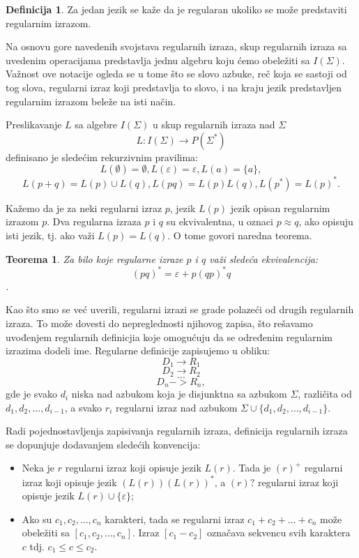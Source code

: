 \documentclass[12pt,oneside]{memoir}
\theoremstyle{plain}
\newtheorem{thm}{Teorema}[chapter] %
\theoremstyle{definition}
\newtheorem{defn}{Definicija} %
\begin{document}
\begin{defn}
Za jedan jezik se kaže da je regularan ukoliko se može predstaviti regularnim izrazom. 
\end{defn}

Na osnovu gore navedenih svojstava regularnih izraza, skup regularnih izraza sa uvedenim operacijama predstavlja jednu algebru koju ćemo obeležiti sa $I(\Sigma)$. Važnost ove notacije ogleda se u tome što se slovo azbuke, reč koja se sastoji od tog slova, regularni izraz koji predstavlja to slovo, i na kraju jezik predstavljen regularnim izrazom beleže na isti način. 

Preslikavanje $L$ sa algebre $I(\Sigma)$ u skup regularnih izraza nad $\Sigma$ $$ L : I(\Sigma) \rightarrow P(\Sigma^*)$$ definisano je sledećim rekurzivnim pravilima:
$$ L(\emptyset) = \emptyset, L(\varepsilon) = \varepsilon, L(a) = \{a\},$$
$$ L(p+q) = L(p) \cup L(q), L(pq) = L(p)L(q), L(p^*) = L(p)^*.$$

Kažemo da je za neki regularni izraz $p$, jezik $L(p)$ jezik opisan regularnim izrazom $p$. Dva regularna izraza $p$ i $q$ su ekvivalentna, u oznaci $p \approx q$, ako opisuju isti jezik, tj. ako važi $L(p) = L(q)$. O tome govori naredna teorema.

\begin{thm}
Za bilo koje regularne izraze $p$ i $q$ važi sledeća ekvivalencija: $$(pq)^* = \varepsilon + p(qp)^* q$$.
\end{thm}

Kao što smo se već uverili, regularni izrazi se grade polazeći od drugih regularnih izraza. To može dovesti do nepreglednosti njihovog zapisa, što rešavamo uvođenjem regularnih definicjia koje omogućuju da se određenim regularnim izrazima dodeli ime. Regularne definicije zapisujemo u obliku:
$$D_1  \rightarrow R_1$$
$$D_2  \rightarrow R_2$$
$$ ... $$
$$D_n -> R_n, $$
gde je svako $d_i$ niska nad azbukom koja je disjunktna sa azbukom $\Sigma$, različita od $d_1, d_2, …, d_{i-1}$, a svako $r_i$ regularni izraz nad azbukom $\Sigma \cup \{ d_1, d_2, …, d_{i-1}\}$.

Radi pojednostavljenja zapisivanja regularnih izraza, definicija regularnih izraza se dopunjuje dodavanjem sledećih konvencija:
\begin{itemize}
\item Neka je $r$ regularni izraz koji opisuje jezik $L(r)$. Tada je $(r)^+$ regularni izraz koji opisuje jezik $(L(r))(L(r))^*$, a $(r)?$ regularni izraz koji opisuje jezik $L(r) \cup \{\varepsilon\}$;
\item Ako su $c_1, c_2, …, c_n$ karakteri, tada se regularni izraz $c_1 + c_2 + … + c_n$ može obeležiti sa $[c_1, c_2, …, c_n]$. Izraz $[c_1-c_2]$ označava sekvencu svih karaktera $c$ tdj. $c_1 \leq c \leq c_2$.
\end{itemize}
\end{document}
